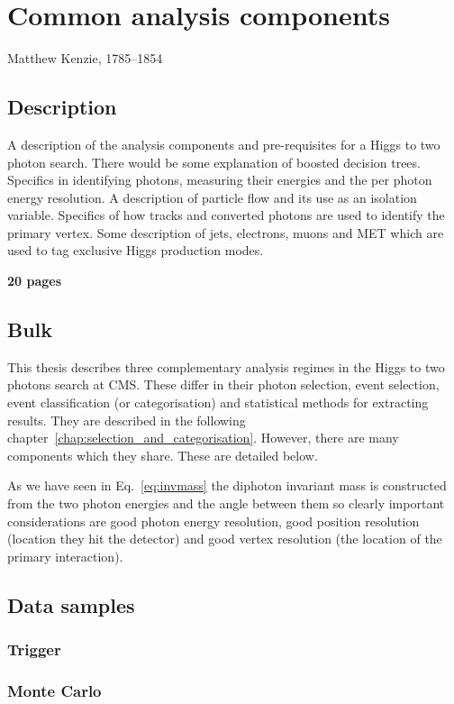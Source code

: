 \chapter{Common analysis components}
\label{chap:common_analysis_components}
{Matthew Kenzie, 1785--1854}

\section{Description}

A description of the analysis components and pre-requisites for a Higgs to two photon search. There would be some explanation of boosted decision trees. Specifics in identifying photons, measuring their energies and the per photon energy resolution. A description of particle flow and its use as an isolation variable. Specifics of how tracks and converted photons are used to identify the primary vertex. Some description of jets, electrons, muons and MET which are used to tag exclusive Higgs production modes.

\textbf{20 pages}

\section{Bulk}

This thesis describes three complementary analysis regimes in the Higgs to two photons search at CMS. These differ in their photon selection, event selection, event classification (or categorisation) and statistical methods for extracting results. They are described in the following chapter~\ref{chap:selection_and_categorisation}. However, there are many components which they share. These are detailed below.

As we have seen in Eq.~\ref{eq:invmass} the diphoton invariant mass is constructed from the two photon energies and the angle between them so clearly important considerations are good photon energy resolution, good position resolution (location they hit the detector) and good vertex resolution (the location of the primary interaction).


\section{Data samples}
\subsection{Trigger}
\subsection{Monte Carlo}
